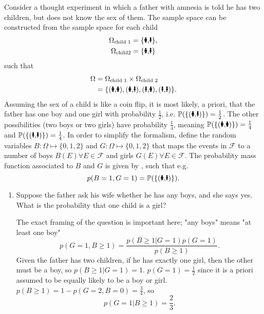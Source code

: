\begin{example}
	Consider a thought experiment in which a father with amnesia is told he has two children, but does not know the sex of them. The sample space can be constructed from the sample space for each child
	\begin{equation}
		\begin{split}
			\Omega_{\text{child 1}} &= \{\text{\Gentsroom,\Ladiesroom}\},\\
			\Omega_{\text{child2}} &= \{\text{\Gentsroom,\Ladiesroom}\}\\
		\end{split}
	\end{equation}
	such that
	\begin{equation}
		\begin{split}
			\Omega &= \Omega_{\text{child 1}}\times \Omega_{\text{child 2}}\\
			&= \{(\text{\Gentsroom,\Gentsroom}),(\text{\Gentsroom,\Ladiesroom}),(\text{\Ladiesroom,\Gentsroom}),(\text{\Ladiesroom,\Ladiesroom})\}.
		\end{split}
	\end{equation}
	Assuming the sex of a child is like a coin flip, it is most likely, a priori, that the father has one boy and one girl with probability $\frac{1}{2}$, i.e.  $\mathbb{P}(\{(\text{\Gentsroom,\Ladiesroom})\})=\frac{1}{2}$. The other possibilities (two boys or two girls) have probability $\frac{1}{4}$, meaning $\mathbb{P}(\{(\text{\Gentsroom,\Gentsroom})\})=\frac{1}{4}$ and $\mathbb{P}(\{(\text{\Ladiesroom,\Ladiesroom})\})=\frac{1}{4}$. In order to simplify the formalism, define the random variables $B: \Omega \mapsto \{0,1,2\}$ and $G: \Omega \mapsto \{0,1,2\}$ that maps the events in $\mathcal{F}$ to a number of boys $B(E)\forall E\in \mathcal{F}$ and girls $G(E)\forall E\in \mathcal{F}$. The probability mass function associated to $B$ and $G$ is given by , such that e.g.
	\begin{equation}
		p(B = 1, G = 1)= \mathbb{P}(\{(\text{\Gentsroom,\Ladiesroom})\}).
	\end{equation}

	\begin{enumerate}
		\item Suppose the father ask his wife whether he has any boys, and she says yes. What is the probability that one child is a girl?
		
		The exact framing of the question is important here; "any boys" means "at least one boy"
		\begin{equation}
			p(G=1,B\geq 1) = \frac{p(B\geq1|G=1)p(G=1)}{p(B\geq 1)}.
		\end{equation}
		Given the father has two children, if he has exactly one girl, then the other must be a boy, so $p(B\geq 1|G=1)=1$. $p(G=1)=\frac{1}{2}$ since it is a priori assumed to be equally likely to be a boy or girl. $p(B\geq 1)=1-p(G=2,B=0)=\frac{3}{4}$, so
		\begin{equation}
			p(G=1|B\geq 1) = \frac{2}{3}.
		\end{equation}
		

\end{enumerate}
\end{example}
